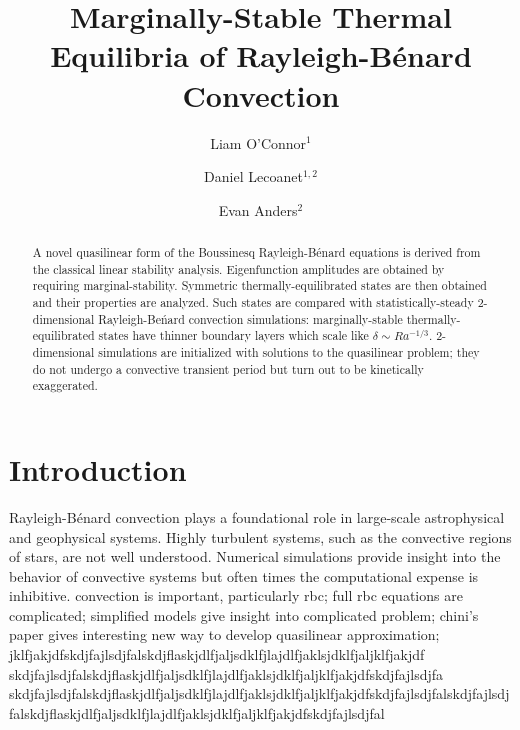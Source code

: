 \documentclass[reprint,amsmath,amssymb,aps]{revtex4-1}
\begin{document}
\title{Marginally-Stable Thermal Equilibria of Rayleigh-Bénard Convection}

\author{Liam O'Connor$^1$}
\author{Daniel Lecoanet$^{1, 2}$}
\author{Evan Anders$^2$}

\begin{abstract}
A novel quasilinear form of the Boussinesq Rayleigh-B\'enard equations is derived from the classical linear stability analysis. Eigenfunction amplitudes are obtained by requiring marginal-stability. Symmetric thermally-equilibrated states are then obtained and their properties are analyzed. Such states are compared with statistically-steady 2-dimensional Rayleigh-Be\'nard convection simulations: marginally-stable thermally-equilibrated states have thinner boundary layers which scale like $\delta \sim Ra^{-1/3}$. 2-dimensional simulations are initialized with solutions to the quasilinear problem;
they do not undergo a convective transient period but turn out to be kinetically exaggerated.
\end{abstract}


\maketitle

\section{Introduction}
Rayleigh-B\'enard convection plays a foundational role in large-scale astrophysical and geophysical systems. Highly turbulent systems, such as the convective regions of stars, are not well understood. Numerical simulations provide insight into the behavior of convective systems but often times the computational expense is inhibitive. 
convection is important, particularly rbc; full rbc equations are complicated; simplified models give insight into complicated problem; chini's paper gives interesting new way to develop quasilinear approximation; jklfjakjdfskdjfajlsdjfalskdjflaskjdlfjaljsdklfjlajdlfjaklsjdklfjaljklfjakjdf skdjfajlsdjfalskdjflaskjdlfjaljsdklfjlajdlfjaklsjdklfjaljklfjakjdfskdjfajlsdjfa skdjfajlsdjfalskdjflaskjdlfjaljsdklfjlajdlfjaklsjdklfjaljklfjakjdfskdjfajlsdjfalskdjfajlsdjfalskdjflaskjdlfjaljsdklfjlajdlfjaklsjdklfjaljklfjakjdfskdjfajlsdjfal
\end{document}
